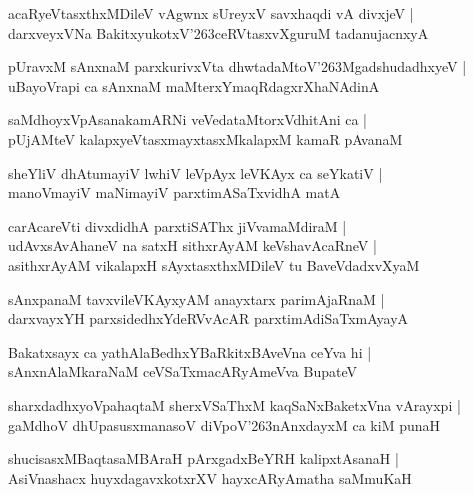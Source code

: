 \documentclass[twoside,12pt,openright]{book}
\def\S{\char'263}
\newcounter{shloka}[chapter]
\begin{document}
\begin{shloka}%
acaRyeVtasxthxMDileV vAgwnx sUreyxV savxhaqdi vA divxjeV |\\
darxveyxVNa BakitxyukotxV\S ceRVtasxvXguruM tadanujacnxyA 
\end{shloka}

\begin{shloka}%
pUravxM sAnxnaM parxkurivxVta dhwtadaMtoV\S MgadshudadhxyeV |\\
uBayoVrapi ca sAnxnaM maMterxYmaqRdagxrXhaNAdinA
\end{shloka}

\begin{shloka}%
saMdhoyxVpAsanakamARNi veVedataMtorxVdhitAni ca |\\
pUjAMteV kalapxyeVtasxmayxtasxMkalapxM kamaR pAvanaM 
\end{shloka}

\begin{shloka}%
sheYliV dhAtumayiV lwhiV leVpAyx leVKAyx ca seYkatiV |\\
manoVmayiV maNimayiV parxtimASaTxvidhA matA 
\end{shloka}

\begin{shloka}%
carAcareVti divxdidhA parxtiSAThx jiVvamaMdiraM |\\
udAvxsAvAhaneV na satxH sithxrAyAM keVshavAcaRneV |\\
asithxrAyAM vikalapxH sAyxtasxthxMDileV tu BaveVdadxvXyaM 
\end{shloka}

\begin{shloka}%
sAnxpanaM tavxvileVKAyxyAM anayxtarx parimAjaRnaM |\\
darxvayxYH parxsidedhxYdeRVvAcAR parxtimAdiSaTxmAyayA 
\end{shloka}

\begin{shloka}%
Bakatxsayx ca yathAlaBedhxYBaRkitxBAveVna ceYva hi |\\
sAnxnAlaMkaraNaM ceVSaTxmacARyAmeVva BupateV 
\end{shloka}

\begin{shloka}%
sharxdadhxyoVpahaqtaM sherxVSaThxM kaqSaNxBaketxVna vArayxpi |\\
gaMdhoV dhUpasusxmanasoV diVpoV\S nAnxdayxM ca kiM punaH 
\end{shloka}

\begin{shloka}%
shucisasxMBaqtasaMBAraH pArxgadxBeYRH kalipxtAsanaH |\\
AsiVnashacx  huyxdagavxkotxrXV hayxcARyAmatha saMmuKaH 
\end{shloka}
\end{document}
